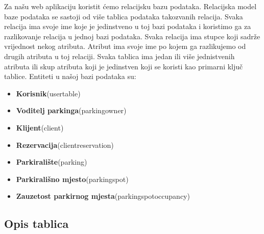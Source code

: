 Za našu web aplikaciju koristit ćemo relacijsku bazu podataka. Relacijska model baze podataka se sastoji od više tablica podataka takozvanih relacija. Svaka relacija ima svoje ime koje je jedinstveno u toj bazi podataka i koristimo ga za razlikovanje relacija u jednoj bazi podataka. Svaka relacija ima stupce koji sadrže vrijednost nekog atributa. Atribut ima svoje ime po kojem ga razlikujemo od drugih atributa u toj relaciji. Svaka tablica ima jedan ili više jednistvenih atributa ili skup atributa koji je jedinstven koji se koristi kao primarni ključ tablice. Entiteti u našoj bazi podataka su:

\begin{itemize}
	\item \textbf{Korisnik}(usertable)
	\item \textbf{Voditelj parkinga}(parkingowner)
	\item \textbf{Klijent}(client)
	\item \textbf{Rezervacija}(clientreservation)
	\item \textbf{Parkiralište}(parking)
	\item \textbf{Parkirališno mjesto}(parkingspot)
	\item \textbf{Zauzetost parkirnog mjesta}(parkingspotoccupancy)
\end{itemize}



\subsection{Opis tablica}



